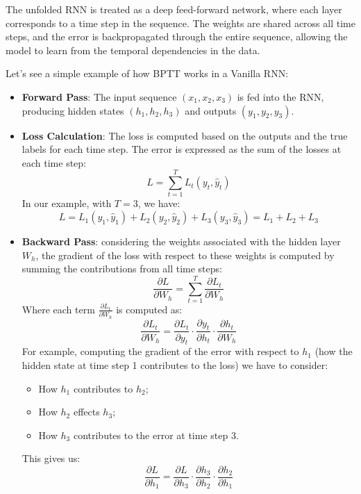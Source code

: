 The unfolded RNN is treated as a deep feed-forward network, where each layer corresponds to a time step in the sequence.
The weights are shared across all time steps, and the error is backpropagated through the entire sequence, allowing the model to learn from the temporal dependencies in the data.

Let's see a simple example of how BPTT works in a Vanilla RNN:
\begin{itemize}
    \item \textbf{Forward Pass}: The input sequence $(x_1, x_2, x_3)$ is fed into the RNN, producing hidden states $(h_1, h_2, h_3)$ and outputs $(y_1, y_2, y_3)$.
    \item \textbf{Loss Calculation}: The loss is computed based on the outputs and the true labels for each time step.
    The error is expressed as the sum of the losses at each time step:
    \begin{equation}
        L = \sum_{t=1}^{T} L_t(y_t, \hat{y}_t)
    \end{equation}
    In our example, with $T=3$, we have:
    \begin{equation}
        L = L_1(y_1, \hat{y}_1) + L_2(y_2, \hat{y}_2) + L_3(y_3, \hat{y}_3) = L_1 + L_2 + L_3
    \end{equation}
    \item \textbf{Backward Pass}: considering the weights associated with the hidden layer $W_h$, 
    the gradient of the loss with respect to these weights is computed by summing the contributions from all time steps:
    \begin{equation}
        \frac{\partial L}{\partial W_h} = \sum_{t=1}^{T} \frac{\partial L_t}{\partial W_h}
    \end{equation}
    Where each term $\frac{\partial L_t}{\partial W_h}$ is computed as:
    \begin{equation}
        \frac{\partial L_t}{\partial W_h} = \frac{\partial L_t}{\partial y_t} \cdot \frac{\partial y_t}{\partial h_t} \cdot \frac{\partial h_t}{\partial W_h}
    \end{equation}
    For example, computing the gradient of the error with respect to $h_1$ (how the hidden state at time step 1 contributes to the loss) we have to consider:
    \begin{itemize}
        \item How $h_1$ contributes to $h_2$;
        \item How $h_2$ effects $h_3$;
        \item How $h_3$ contributes to the error at time step 3.
    \end{itemize}
    This gives us:
    \begin{equation}
        \frac{\partial L}{\partial h_1} = \frac{\partial L}{\partial h_3} \cdot \frac{\partial h_3}{\partial h_2} \cdot \frac{\partial h_2}{\partial h_1}
    \end{equation}
\end{itemize}
